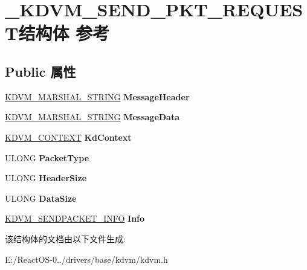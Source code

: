 \hypertarget{struct___k_d_v_m___s_e_n_d___p_k_t___r_e_q_u_e_s_t}{}\section{\+\_\+\+K\+D\+V\+M\+\_\+\+S\+E\+N\+D\+\_\+\+P\+K\+T\+\_\+\+R\+E\+Q\+U\+E\+S\+T结构体 参考}
\label{struct___k_d_v_m___s_e_n_d___p_k_t___r_e_q_u_e_s_t}
\subsection*{Public 属性}
\begin{DoxyCompactItemize}
\item 
\mbox{\label{struct___k_d_v_m___s_e_n_d___p_k_t___r_e_q_u_e_s_t_ac7a46b49a8b66d3e669b08ce99cce2db}} 
\hyperlink{struct___k_d_v_m___m_a_r_s_h_a_l___s_t_r_i_n_g}{K\+D\+V\+M\+\_\+\+M\+A\+R\+S\+H\+A\+L\+\_\+\+S\+T\+R\+I\+NG} {\bfseries Message\+Header}
\item 
\mbox{\label{struct___k_d_v_m___s_e_n_d___p_k_t___r_e_q_u_e_s_t_a4709d61007b37ebe53a48afbcf83ad5b}} 
\hyperlink{struct___k_d_v_m___m_a_r_s_h_a_l___s_t_r_i_n_g}{K\+D\+V\+M\+\_\+\+M\+A\+R\+S\+H\+A\+L\+\_\+\+S\+T\+R\+I\+NG} {\bfseries Message\+Data}
\item 
\mbox{\label{struct___k_d_v_m___s_e_n_d___p_k_t___r_e_q_u_e_s_t_a82a2cc78df0654e7af28dcd4c7c0271f}} 
\hyperlink{struct___k_d_v_m___c_o_n_t_e_x_t}{K\+D\+V\+M\+\_\+\+C\+O\+N\+T\+E\+XT} {\bfseries Kd\+Context}
\item 
\mbox{\label{struct___k_d_v_m___s_e_n_d___p_k_t___r_e_q_u_e_s_t_ae1aab35a08626e6348b027b1dc466442}} 
U\+L\+O\+NG {\bfseries Packet\+Type}
\item 
\mbox{\label{struct___k_d_v_m___s_e_n_d___p_k_t___r_e_q_u_e_s_t_a0686dec21d7b6795fa4f0a29107c6135}} 
U\+L\+O\+NG {\bfseries Header\+Size}
\item 
\mbox{\label{struct___k_d_v_m___s_e_n_d___p_k_t___r_e_q_u_e_s_t_ad556c3538eaa355ba979d9b34b941438}} 
U\+L\+O\+NG {\bfseries Data\+Size}
\item 
\mbox{\label{struct___k_d_v_m___s_e_n_d___p_k_t___r_e_q_u_e_s_t_abd192de163fe6b05c2278ff2b275e564}} 
\hyperlink{struct_k_d_v_m___s_e_n_d_p_a_c_k_e_t___i_n_f_o}{K\+D\+V\+M\+\_\+\+S\+E\+N\+D\+P\+A\+C\+K\+E\+T\+\_\+\+I\+N\+FO} {\bfseries Info}
\end{DoxyCompactItemize}


该结构体的文档由以下文件生成\+:\begin{DoxyCompactItemize}
\item 
E\+:/\+React\+O\+S-\/0../drivers/base/kdvm/kdvm.\+h\end{DoxyCompactItemize}
